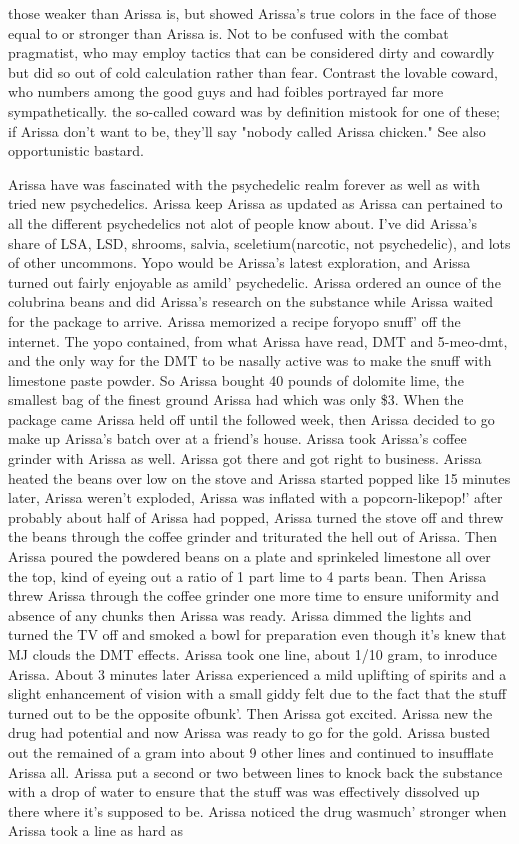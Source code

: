 \documentclass[12pt]{book}
\begin{document}
those weaker than Arissa is, but showed Arissa's true colors in the face of those equal to or stronger than Arissa is. Not to be confused with the combat pragmatist, who may employ tactics that can be considered dirty and cowardly but did so out of cold calculation rather than fear. Contrast the lovable coward, who numbers among the good guys and had foibles portrayed far more sympathetically. the so-called coward was by definition mistook for one of these; if Arissa don't want to be, they'll say "nobody called Arissa chicken." See also opportunistic bastard.



Arissa have was fascinated with the psychedelic realm forever as well as with tried new psychedelics. Arissa keep Arissa as updated as Arissa can pertained to all the different psychedelics not alot of people know about. I've did Arissa's share of LSA, LSD, shrooms, salvia, sceletium(narcotic, not psychedelic), and lots of other uncommons. Yopo would be Arissa's latest exploration, and Arissa turned out fairly enjoyable as amild' psychedelic. Arissa ordered an ounce of the colubrina beans and did Arissa's research on the substance while Arissa waited for the package to arrive. Arissa memorized a recipe foryopo snuff' off the internet. The yopo contained, from what Arissa have read, DMT and 5-meo-dmt, and the only way for the DMT to be nasally active was to make the snuff with limestone paste powder. So Arissa bought 40 pounds of dolomite lime, the smallest bag of the finest ground Arissa had which was only \$3. When the package came Arissa held off until the followed week, then Arissa decided to go make up Arissa's batch over at a friend's house. Arissa took Arissa's coffee grinder with Arissa as well. Arissa got there and got right to business. Arissa heated the beans over low on the stove and Arissa started popped like 15 minutes later, Arissa weren't exploded, Arissa was inflated with a popcorn-likepop!' after probably about half of Arissa had popped, Arissa turned the stove off and threw the beans through the coffee grinder and triturated the hell out of Arissa. Then Arissa poured the powdered beans on a plate and sprinkeled limestone all over the top, kind of eyeing out a ratio of 1 part lime to 4 parts bean. Then Arissa threw Arissa through the coffee grinder one more time to ensure uniformity and absence of any chunks then Arissa was ready. Arissa dimmed the lights and turned the TV off and smoked a bowl for preparation even though it's knew that MJ clouds the DMT effects. Arissa took one line, about 1/10 gram, to inroduce Arissa. About 3 minutes later Arissa experienced a mild uplifting of spirits and a slight enhancement of vision with a small giddy felt due to the fact that the stuff turned out to be the opposite ofbunk'. Then Arissa got excited. Arissa new the drug had potential and now Arissa was ready to go for the gold. Arissa busted out the remained of a gram into about 9 other lines and continued to insufflate Arissa all. Arissa put a second or two between lines to knock back the substance with a drop of water to ensure that the stuff was was effectively dissolved up there where it's supposed to be. Arissa noticed the drug wasmuch' stronger when Arissa took a line as hard as 
\end{document}
